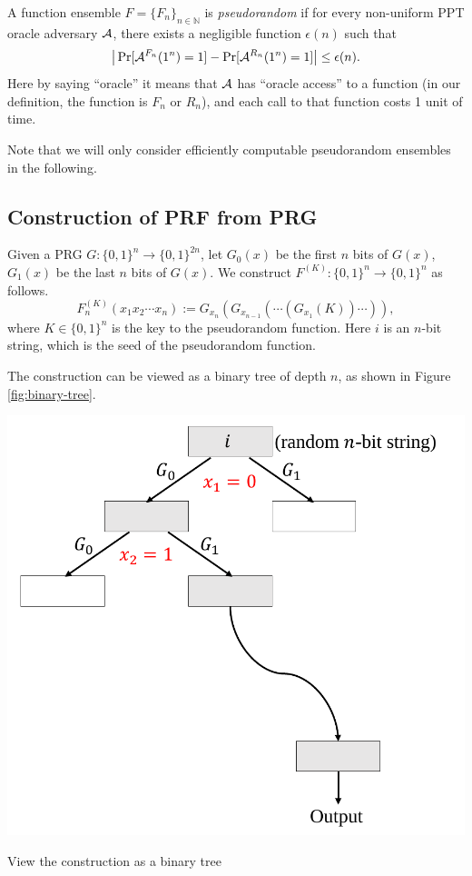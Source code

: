 \begin{definition}
A function ensemble $F = \{F_n\}_{n \in \mathbb{N}}$ is \emph{pseudorandom} if
for every non-uniform PPT oracle adversary $\mathcal{A}$, there exists a negligible function $\epsilon(n)$ such that
\[
\big| \Pr[\mathcal{A}^{F_n} (1^n) = 1] - \Pr[\mathcal{A}^{R_n} (1^n) = 1]  \big| \leq \epsilon(n).
\]
Here by saying ``oracle'' it means that $\mathcal{A}$ has ``oracle access'' to a function (in our definition, the function is $F_n$ or $R_n$), and each call to that function costs 1 unit of time.
\end{definition}

Note that we will only consider efficiently computable pseudorandom ensembles in the following.

\subsection{Construction of PRF from PRG}

\begin{construction}
Given a PRG $G: \{0, 1\}^n \rightarrow \{0, 1\}^{2n}$,
let $G_0(x)$ be the first $n$ bits of $G(x)$, $G_1(x)$ be the last $n$ bits of $G(x)$.
We construct $F^{(K)}: \{0, 1\}^n \rightarrow \{0, 1\}^n$ as follows.
\[
F^{(K)}_n(x_1 x_2 \cdots x_n) := G_{x_n}(G_{x_{n-1}} (\cdots(G_{x_1}(K)) \cdots  )),
\]
where $K \in \{0,1\}^n$ is the key to the pseudorandom function. Here $i$ is an $n$-bit string, which is the seed of the pseudorandom function.
\end{construction}
The construction can be viewed as a binary tree of depth $n$, as shown in Figure \ref{fig:binary-tree}.

\begin{marginfigure}
    \centering
    \includegraphics[width=\textwidth]{Old Scribe Notes/binary-tree.pdf}
    \caption{View the construction as a binary tree}
    \label{fig:binary-tree}
\end{marginfigure}

